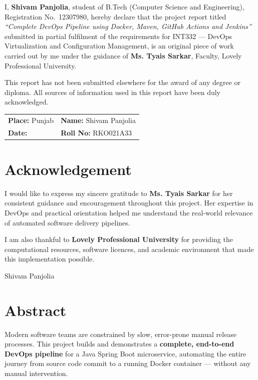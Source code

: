 \documentclass[12pt,a4paper]{report}
\begin{document}
I, \textbf{Shivam Panjolia}, student of B.Tech (Computer Science and Engineering), Registration No.\ 12307980, hereby declare that the project report titled \textit{``Complete DevOps Pipeline using Docker, Maven, GitHub Actions and Jenkins''} submitted in partial fulfilment of the requirements for INT332 — DevOps Virtualization and Configuration Management, is an original piece of work carried out by me under the guidance of \textbf{Ms. Tyais Sarkar}, Faculty, Lovely Professional University.

This report has not been submitted elsewhere for the award of any degree or diploma. All sources of information used in this report have been duly acknowledged.

\vspace{2cm}
\begin{tabular}{@{}ll}
  \textbf{Place:} Punjab & \textbf{Name:} Shivam Panjolia \\[0.5cm]
  \textbf{Date:} \underline{\hspace{3cm}} & \textbf{Roll No:} RKO021A33
\end{tabular}

\chapter*{Acknowledgement}

I would like to express my sincere gratitude to \textbf{Ms. Tyais Sarkar} for her consistent guidance and encouragement throughout this project. Her expertise in DevOps and practical orientation helped me understand the real-world relevance of automated software delivery pipelines.

I am also thankful to \textbf{Lovely Professional University} for providing the computational resources, software licences, and academic environment that made this implementation possible.

\vspace{2cm}
\hfill Shivam Panjolia

\chapter*{Abstract}

Modern software teams are constrained by slow, error-prone manual release processes. This project builds and demonstrates a \textbf{complete, end-to-end DevOps pipeline} for a Java Spring Boot microservice, automating the entire journey from source code commit to a running Docker container — without any manual intervention.
\end{document}
